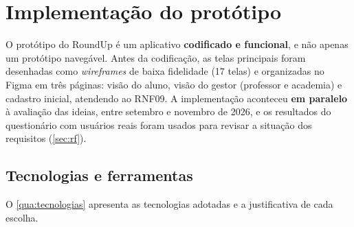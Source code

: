 
\chapter{Implementação do protótipo}
\label{cap:implementacao}

O protótipo do RoundUp é um aplicativo \textbf{codificado e funcional},
e não apenas um protótipo navegável. Antes da codificação, as telas
principais foram desenhadas como \textit{wireframes} de baixa fidelidade
(17 telas) e organizadas no Figma em três páginas: visão do aluno, visão
do gestor (professor e academia) e cadastro inicial, atendendo ao RNF09.
A implementação aconteceu \textbf{em paralelo} à avaliação das ideias,
entre setembro e novembro de 2026, e os resultados do questionário com
usuários reais foram usados para revisar a situação dos requisitos
(\autoref{sec:rf}).

\section{Tecnologias e ferramentas}

O \autoref{qua:tecnologias} apresenta as tecnologias adotadas e a
justificativa de cada escolha.

